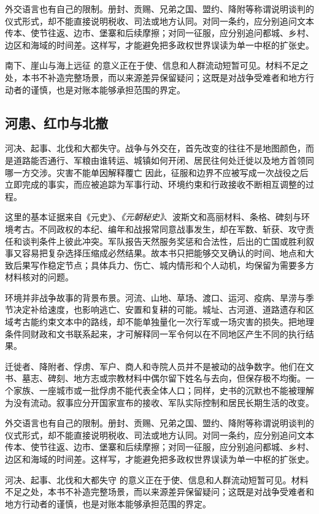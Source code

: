外交语言也有自己的限制。册封、贡赐、兄弟之国、盟约、降附等称谓说明谈判的仪式形式，却不能直接说明税收、司法或地方认同。对同一条约，应分别追问文本传本、使节往返、边市、堡寨和后续摩擦；对同一征服，应分别追问都城、乡村、边区和海域的时间差。这样写，才能避免把多政权世界误读为单一中枢的扩张史。

南下、崖山与海上远征 的意义正在于使、信息和人群流动短暂可见。材料不足之处，本书不补造完整场景，而以来源差异保留疑问；这既是对战争受难者和地方行动者的谨慎，也是对账本能够承担范围的界定。

\subsection{河患、红巾与北撤}

河决、起事、北伐和大都失守。战争与外交在，首先改变的往往不是地图颜色，而是道路能否通行、军粮由谁转运、城镇如何开闭、居民往何处迁徙以及地方首领同哪一方交涉。灾害不能单因解释覆亡 因此，征服和边界不应被写成一次战役之后立即完成的事实，而应被追踪为军事行动、环境约束和行政接收不断相互调整的过程。

这里的基本证据来自《元史》、\textit{《元朝秘史》}、波斯文和高丽材料、条格、碑刻与环境考古。不同政权的本纪、编年和战报常同意战事发生，却在军数、斩获、攻守责任和谈判条件上彼此冲突。军队报告天然服务奖惩和合法性，后出的亡国或胜利叙事又容易把复杂选择压缩成必然结果。故本书只把能够交叉确认的时间、地点和大致后果写作稳定节点；具体兵力、伤亡、城内情形和个人动机，均保留为需要多方材料核对的问题。

环境并非战争故事的背景布景。河流、山地、草场、渡口、运河、疫病、旱涝与季节决定补给速度，也影响逃亡、安置和复耕的可能。城址、古河道、道路遗存和区域考古能约束文本中的路线，却不能单独量化一次行军或一场灾害的损失。把地理条件同财政和文书联系起来，才可解释同一军令何以在不同地区产生不同的执行结果。

迁徙者、降附者、俘虏、军户、商人和寺院人员并不是被动的战争数字。他们在文书、墓志、碑刻、地方志或宗教材料中偶尔留下姓名与去向，但保存极不均衡。一个家族、一座城市或一批俘虏不能代表全体人口；同样，史书的沉默也不能被理解为没有流动。叙事应分开国家宣布的接收、军队实际控制和居民长期生活的改变。

外交语言也有自己的限制。册封、贡赐、兄弟之国、盟约、降附等称谓说明谈判的仪式形式，却不能直接说明税收、司法或地方认同。对同一条约，应分别追问文本传本、使节往返、边市、堡寨和后续摩擦；对同一征服，应分别追问都城、乡村、边区和海域的时间差。这样写，才能避免把多政权世界误读为单一中枢的扩张史。

河决、起事、北伐和大都失守 的意义正在于使、信息和人群流动短暂可见。材料不足之处，本书不补造完整场景，而以来源差异保留疑问；这既是对战争受难者和地方行动者的谨慎，也是对账本能够承担范围的界定。

